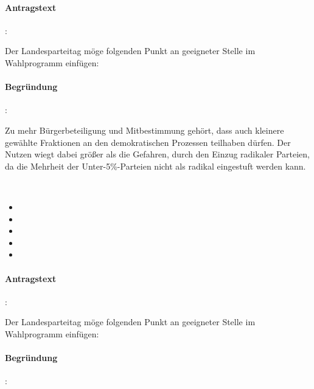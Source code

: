 \paragraph{Antragstext}:

Der Landesparteitag möge folgenden Punkt an geeigneter Stelle im Wahlprogramm einfügen:


\paragraph{Begründung}:

Zu mehr Bürgerbeteiligung und Mitbestimmung gehört, dass auch kleinere gewählte Fraktionen an den demokratischen Prozessen teilhaben dürfen. Der Nutzen wiegt dabei größer als die Gefahren, durch den Einzug radikaler Parteien, da die Mehrheit der Unter-5\%-Parteien nicht als radikal eingestuft werden kann.


\label{wpa:prozenthuerde2}
\\
\begin{itemize}
\item {}
\item {}
\item {}
\item {}
\item {}
\end{itemize}

\paragraph{Antragstext}:

Der Landesparteitag möge folgenden Punkt an geeigneter Stelle im Wahlprogramm einfügen:


\paragraph{Begründung}:

